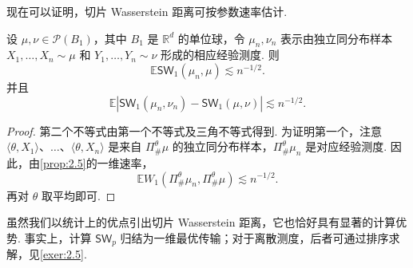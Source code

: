 现在可以证明，切片 Wasserstein 距离可按参数速率估计.
\begin{proposition}\label{prop:2.26}
设 $\mu,\nu\in\mathcal P(B_1)$，其中 $B_1$ 是 $\mathbb R^d$ 的单位球，令 $\mu_n,\nu_n$ 表示由独立同分布样本 $X_1,\ldots,X_n\sim\mu$ 和 $Y_1,\ldots,Y_n\sim\nu$ 形成的相应经验测度. 则
$$\mathbb E\mathsf{SW}_1(\mu_n,\mu)\lesssim n^{-1/2}.$$
并且
$$\mathbb E|\mathsf{SW}_1(\mu_n,\nu_n)-\mathsf{SW}_1(\mu,\nu)|\lesssim n^{-1/2}.$$
\end{proposition}
\begin{proof}
第二个不等式由第一个不等式及三角不等式得到. 为证明第一个，注意 $\langle\theta,X_1\rangle$、$\ldots$、$\langle\theta,X_n\rangle$ 是来自 $\Pi^\theta_\#\mu$ 的独立同分布样本，$\Pi^\theta_\#\mu_n$ 是对应经验测度. 因此，由\autoref{prop:2.5}的一维速率，
$$\mathbb EW_1(\Pi^\theta_\#\mu_n,\Pi^\theta_\#\mu)\lesssim n^{-1/2}.$$
再对 $\theta$ 取平均即可.
\end{proof}
虽然我们以统计上的优点引出切片 Wasserstein 距离，它也恰好具有显著的计算优势. 事实上，计算 $\mathsf{SW}_p$ 归结为一维最优传输；对于离散测度，后者可通过排序求解，见\autoref{exer:2.5}.
